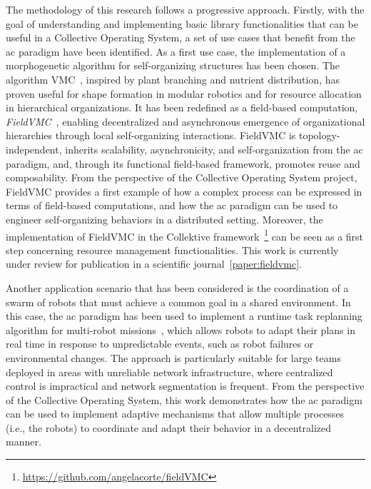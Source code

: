\documentclass[runningheads]{llncs}
\begin{document}
    The methodology of this research follows a progressive approach.
%
    Firstly,
    with the goal of understanding and implementing basic library functionalities that can be useful in a Collective Operating System,
    a set of use cases that benefit from the \ac{ac} paradigm have been identified.
%
    As a first use case,
    the implementation of a morphogenetic algorithm for self-organizing structures has been chosen.
%
    The algorithm \ac{VMC}~\cite{DBLP:conf/gecco/ZahadatHS17},
    inspired by plant branching and nutrient distribution,
    has proven useful for shape formation in modular robotics
    and for resource allocation in hierarchical organizations.
%
    It has been redefined as a field-based computation, \emph{FieldVMC}~\cite{DBLP:conf/acsos/CortecchiaPCC24},
    enabling decentralized and asynchronous emergence of organizational hierarchies
    through local self-organizing interactions.
%
    FieldVMC is topology-independent, inherits scalability, asynchronicity, and self-organization from the \ac{ac} paradigm,
    and, through its functional field-based framework, promotes reuse and composability.
%
    From the perspective of the Collective Operating System project,
    FieldVMC provides a first example of how a complex process can be expressed in terms of field-based computations,
    and how the \ac{ac} paradigm can be used to engineer self-organizing behaviors in a distributed setting.
%
    Moreover,
    the implementation of FieldVMC in the Collektive framework~\footnote{\url{https://github.com/angelacorte/fieldVMC}}
    can be seen as a first step concerning resource management functionalities.
%
    This work is currently under review for publication in a scientific journal~\ref{paper:fieldvmc}.

    Another application scenario that has been considered is the coordination of a swarm of robots that must achieve a common goal in a shared environment.
%
    In this case,
    the \ac{ac} paradigm has been used to implement a runtime task replanning algorithm for multi-robot missions~\cite{DBLP:conf/acsos/AguzziBCMPPV25},
    which allows robots to adapt their plans in real time in response to unpredictable events, such as
    robot failures or environmental changes.
%
    The approach is particularly suitable for large teams deployed in areas with unreliable network infrastructure,
    where centralized control is impractical and network segmentation is frequent.
%
    From the perspective of the Collective Operating System,
    this work demonstrates how the \ac{ac} paradigm can be used to implement adaptive mechanisms
    that allow multiple processes (i.e., the robots) to coordinate and adapt their behavior in a decentralized manner.
\end{document}
